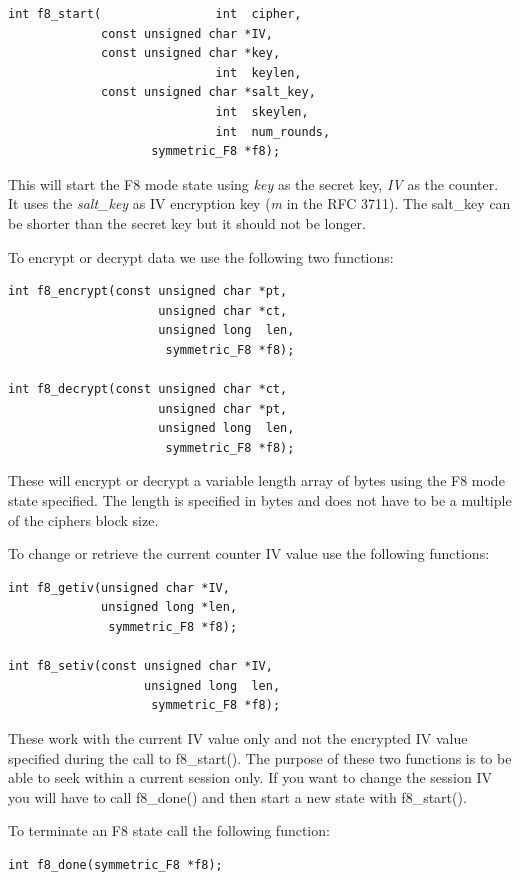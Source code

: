 \documentclass[synpaper]{book}
\begin{document}
\begin{verbatim}
int f8_start(                int  cipher,
             const unsigned char *IV,
             const unsigned char *key,
                             int  keylen,
             const unsigned char *salt_key,
                             int  skeylen,
                             int  num_rounds,
                    symmetric_F8 *f8);
\end{verbatim}
This will start the F8 mode state using \textit{key} as the secret key, \textit{IV} as the counter.  It uses the \textit{salt\_key} as IV encryption key
(\textit{m} in the RFC 3711).  The salt\_key can be shorter than the secret key but it should not be longer.

To encrypt or decrypt data we use the following two functions:

 
\begin{verbatim}
int f8_encrypt(const unsigned char *pt,
                     unsigned char *ct,
                     unsigned long  len,
                      symmetric_F8 *f8);

int f8_decrypt(const unsigned char *ct,
                     unsigned char *pt,
                     unsigned long  len,
                      symmetric_F8 *f8);
\end{verbatim}
These will encrypt or decrypt a variable length array of bytes using the F8 mode state specified.  The length is specified in bytes and does not have to be a multiple
of the ciphers block size.

To change or retrieve the current counter IV value use the following functions:
 
\begin{verbatim}
int f8_getiv(unsigned char *IV,
             unsigned long *len,
              symmetric_F8 *f8);

int f8_setiv(const unsigned char *IV,
                   unsigned long  len,
                    symmetric_F8 *f8);
\end{verbatim}
These work with the current IV value only and not the encrypted IV value specified during the call to f8\_start().  The purpose of these two functions is to be
able to seek within a current session only.  If you want to change the session IV you will have to call f8\_done() and then start a new state with
f8\_start().

To terminate an F8 state call the following function:

\begin{verbatim}
int f8_done(symmetric_F8 *f8);
\end{verbatim}
\end{document}
